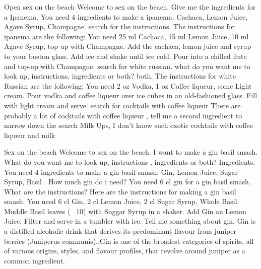 \documentclass[12pt,letterpaper]{article}
\begin{document}
\begin{dialogue}
	 Open sex on the beach
	 Welcome to sex on the beach.
	 Give me the ingredients for a Ipanema.
	 You need 4 ingredients to make a ipanema:
	Cachaca, Lemon Juice, Agave Syrup, Champagne.
	 search for the instructions.
	The instructions for ipanema are the following: You need 25 ml Cachaca, 15 ml Lemon Juice, 10 ml Agave Syrup, top up with Champagne. Add the cachaca, lemon juice and syrup to your boston glass. Add ice and shake until ice cold. Pour into a chilled flute and top-up with Champagne.
	 search for white russian.
	 what do you want me to look up, instructions, ingredients or both?
	 both.
	 The instructions for white Russian are the following: You need 2 oz Vodka, 1 oz Coffee liqueur, some Light cream. Pour vodka and coffee liqueur over ice cubes in an old-fashioned glass. Fill with light cream and serve.
	 search for cocktails with coffee liqueur
	 There are probably a lot of cocktails with coffee liqueur ,
	tell me a second ingredient to narrow down the search
	 Milk
	 Ups, I don't know such exotic cocktails with coffee liqueur and milk
\end{dialogue}

\begin{dialogue}
	 Sex on the beach
	 Welcome to sex on the beach.
	 I want to make a gin basil smash.
	 What do you want me to look up, instructions , ingredients or both?
	 Ingredients.
	 You need 4 ingredients to make a gin basil smash: Gin, Lemon Juice, Sugar Syrup, Basil .
	 How much gin do i need?
	 You need 6 cl gin for a gin basil smash.
	 What are the instructions?
	 Here are the instructions for making a gin basil smash: You need 6 cl Gin, 2 cl Lemon Juice, 2 cl Sugar Syrup, Whole Basil. Muddle Basil leaves (~ 10) with Suggar Syrup in a shaker. Add Gin an Lemon Juice. Filter and serve in a tumbler with ice.
	 Tell me something about gin.
	 Gin is a distilled alcoholic drink that derives its predominant flavour from juniper berries (Juniperus communis)..Gin is one of the broadest categories of spirits, all of various origins, styles, and flavour profiles, that revolve around juniper as a common ingredient.
	
\end{dialogue}
\end{document}
